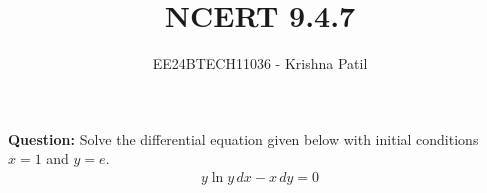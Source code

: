 \documentclass[journal]{IEEEtran}
\begin{document}

\vspace{3cm}

\title{NCERT 9.4.7}
\author{EE24BTECH11036 - Krishna Patil}
{\let\newpage\relax\maketitle}

\renewcommand{\thefigure}{\theenumi}
\renewcommand{\thetable}{\theenumi}
\setlength{\intextsep}{10pt} %

\textbf{Question:} Solve the differential equation given below with initial conditions $ x = 1 $ and $ y = e $.
\begin{align}
	y \ln{y} \, dx - x \, dy = 0
\end{align}
\end{document}
